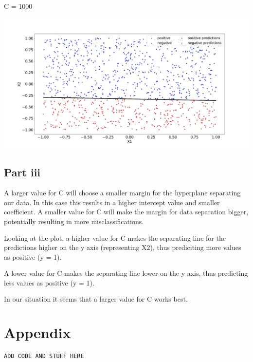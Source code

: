 \documentclass[10pt]{article}
\begin{document}
C = 1000

\includegraphics[scale=0.245]{Figure_C_1000.png}

\subsection*{Part iii}
A larger value for C will choose a smaller margin for the hyperplane
separating our data. In this case this results in a higher intercept value
and smaller coefficient. A smaller value for C will make the margin for data separation
bigger, potentially resulting in more misclassifications.

Looking at the plot, a higher value for C makes the separating line for the predictions
higher on the y axis (representing X2), thus prediciting more values as positive (y = 1).

A lower value for C makes the separating line lower on the y axis, thus predicting less values
as positive (y = 1).

In our situation it seems that a larger value for C works best.

\section*{Appendix}
\begin{lstlisting}[language=Python]
ADD CODE AND STUFF HERE
\end{lstlisting}
\end{document}
